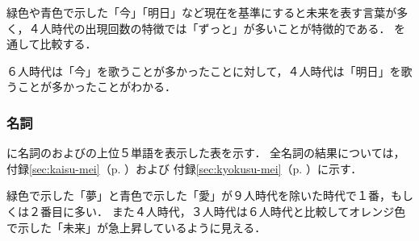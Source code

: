 

緑色や青色で示した「今」「明日」など現在を基準にすると未来を表す言葉が多く，４人時代の出現回数の特徴では「ずっと」が多いことが特徴的である．
%
を通して比較する．

６人時代は「今」を歌うことが多かったことに対して，４人時代は「明日」を歌うことが多かったことがわかる．



\newpage
\subsubsection{名詞}

に名詞の\kaisu および\kyokusu の上位５単語を表示した表を示す．
全名詞の結果については，
付録\ref{sec:kaisu-mei}（p. \pageref{sec:kaisu-mei}）および
付録\ref{sec:kyokusu-mei}（p. \pageref{sec:kyokusu-mei}）に示す．








緑色で示した「夢」と青色で示した「愛」が９人時代を除いた時代で１番，もしくは２番目に多い．
また４人時代，３人時代は６人時代と比較してオレンジ色で示した「未来」が急上昇しているように見える．



